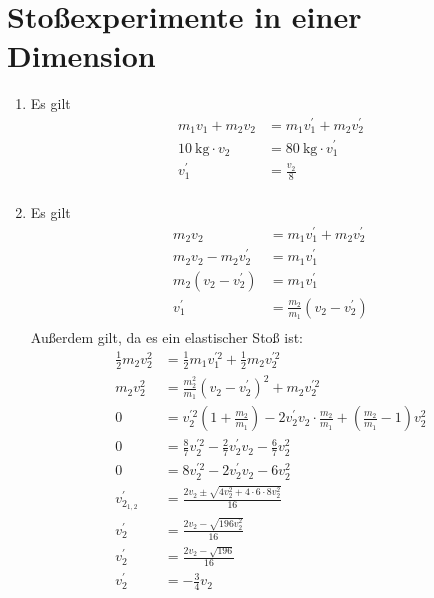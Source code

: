 \documentclass[sectionformat = aufgabe]{gadsescript}
\begin{document}
\section{Stoßexperimente in einer Dimension}
\begin{enumerate}[label=\alph*)]
	\item Es gilt
		\begin{align*}
			m_1 v_1 + m_2 v_2 &= m_1 v_1^{\prime} + m_2 v_2^{\prime} \\
			\qty{ 10 }{ \kilogram } \cdot v_2 &= \qty{ 80 }{ \kilogram } \cdot v_1^{\prime}  \\
			v_1^{\prime} &= \frac{ v_2 }{ 8 } \\
		\end{align*}
	\item Es gilt
		\begin{align*}
			m_2 v_2 &= m_1 v_1^{\prime} + m_2 v_2^{\prime}  \\
			m_2 v_2 - m_2 v_2^{\prime} &= m_1 v_1^{\prime}  \\
			m_2 \left( v_2 - v_2^{\prime} \right) &= m_1 v_1^{\prime}  \\
			v_1^{\prime} &= \frac{ m_2 }{ m_1 } \left( v_2 - v_2^{\prime} \right) \\
		\end{align*}
		Außerdem gilt, da es ein elastischer Stoß ist:
		\begin{align*}
			\frac{ 1 }{ 2 } m_2 v_2^2 &= \frac{ 1 }{ 2 } m_1 v_1^{\prime 2} + \frac{ 1 }{ 2 } m_2 v_2^{\prime 2}  \\
			m_2 v_2^2 &= \frac{ m_2^2 }{ m_1 } \left( v_2 - v_2^{\prime} \right)^2 + m_2 v_2^{\prime 2} \\
			0 &= v_2^{\prime 2} \left( 1 + \frac{ m_2 }{ m_1 } \right) - 2 v_2^{\prime} v_2 \cdot \frac{ m_2 }{ m_1 } + \left( \frac{ m_2 }{ m_1 } - 1 \right) v_2^2  \\
			0 &= \frac{ 8 }{ 7 } v_2^{\prime 2} - \frac{ 2 }{ 7 } v_2^{\prime} v_2 - \frac{ 6 }{ 7 } v_2^2  \\
			0 &= 8 v_2^{\prime 2} - 2 v_2^{\prime} v_2 - 6 v_2^2  \\
			v_{2_{1,2} }^{\prime} &= \frac{ 2 v_2 \pm \sqrt{4 v_2^2 + 4 \cdot 6 \cdot 8 v_2^2}  }{ 16 } \\
			v_2^{\prime} &= \frac{ 2 v_2 - \sqrt{196 v_2^2} }{ 16 } \\
			v_2^{\prime} &= \frac{ 2 v_2 - \sqrt{196} }{ 16 } \\
			v_2^{\prime} &= -\frac{ 3 }{ 4 } v_2 \\
		\end{align*}

\end{enumerate}
\end{document}

